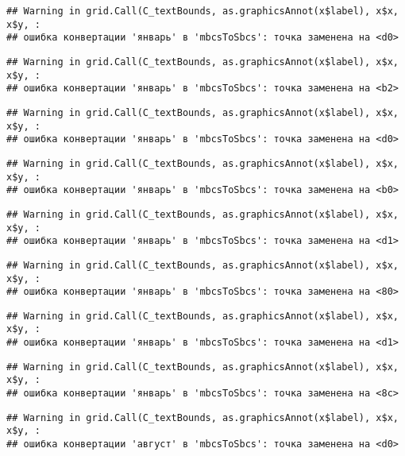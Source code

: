 \documentclass[
]{article}
\begin{document}
\begin{verbatim}
## Warning in grid.Call(C_textBounds, as.graphicsAnnot(x$label), x$x, x$y, :
## ошибка конвертации 'январь' в 'mbcsToSbcs': точка заменена на <d0>
\end{verbatim}

\begin{verbatim}
## Warning in grid.Call(C_textBounds, as.graphicsAnnot(x$label), x$x, x$y, :
## ошибка конвертации 'январь' в 'mbcsToSbcs': точка заменена на <b2>
\end{verbatim}

\begin{verbatim}
## Warning in grid.Call(C_textBounds, as.graphicsAnnot(x$label), x$x, x$y, :
## ошибка конвертации 'январь' в 'mbcsToSbcs': точка заменена на <d0>
\end{verbatim}

\begin{verbatim}
## Warning in grid.Call(C_textBounds, as.graphicsAnnot(x$label), x$x, x$y, :
## ошибка конвертации 'январь' в 'mbcsToSbcs': точка заменена на <b0>
\end{verbatim}

\begin{verbatim}
## Warning in grid.Call(C_textBounds, as.graphicsAnnot(x$label), x$x, x$y, :
## ошибка конвертации 'январь' в 'mbcsToSbcs': точка заменена на <d1>
\end{verbatim}

\begin{verbatim}
## Warning in grid.Call(C_textBounds, as.graphicsAnnot(x$label), x$x, x$y, :
## ошибка конвертации 'январь' в 'mbcsToSbcs': точка заменена на <80>
\end{verbatim}

\begin{verbatim}
## Warning in grid.Call(C_textBounds, as.graphicsAnnot(x$label), x$x, x$y, :
## ошибка конвертации 'январь' в 'mbcsToSbcs': точка заменена на <d1>
\end{verbatim}

\begin{verbatim}
## Warning in grid.Call(C_textBounds, as.graphicsAnnot(x$label), x$x, x$y, :
## ошибка конвертации 'январь' в 'mbcsToSbcs': точка заменена на <8c>
\end{verbatim}

\begin{verbatim}
## Warning in grid.Call(C_textBounds, as.graphicsAnnot(x$label), x$x, x$y, :
## ошибка конвертации 'август' в 'mbcsToSbcs': точка заменена на <d0>
\end{verbatim}
\end{document}
